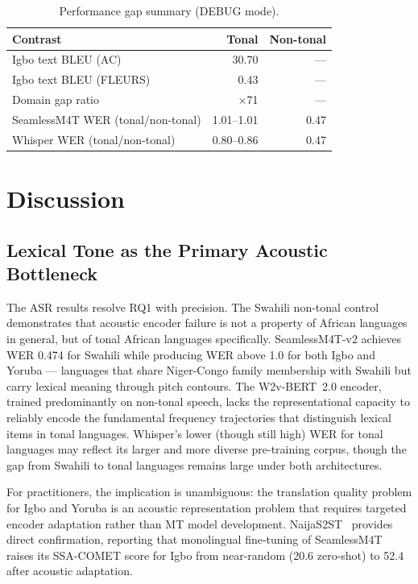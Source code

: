 \documentclass[10pt,twocolumn]{article}
\begin{document}
\begin{table}[H]
\centering
\caption{Performance gap summary (DEBUG mode).}
\label{tab:summary}
\small
\setlength{\tabcolsep}{3pt}
\begin{tabular}{p{4cm}rr}
\toprule
\textbf{Contrast} & \textbf{Tonal} & \textbf{Non-tonal} \\
\midrule
Igbo text BLEU (AC)             & 30.70 & --- \\
Igbo text BLEU (FLEURS)         & 0.43  & --- \\
Domain gap ratio                & $\times$71 & --- \\
\midrule
SeamlessM4T WER (tonal/non-tonal)  & 1.01--1.01  & 0.47 \\
Whisper WER (tonal/non-tonal)      & 0.80--0.86  & 0.47 \\
\bottomrule
\end{tabular}
\end{table}

\section{Discussion}

\subsection{Lexical Tone as the Primary Acoustic Bottleneck}

The ASR results resolve RQ1 with precision.
The Swahili non-tonal control demonstrates that acoustic encoder
failure is not a property of African languages in general, but of
tonal African languages specifically.
SeamlessM4T-v2 achieves WER 0.474 for Swahili while producing WER
above 1.0 for both Igbo and Yoruba --- languages that share
Niger-Congo family membership with Swahili but carry lexical
meaning through pitch contours.
The W2v-BERT~2.0 encoder, trained predominantly on non-tonal
speech, lacks the representational capacity to reliably encode
the fundamental frequency trajectories that distinguish lexical
items in tonal languages.
Whisper's lower (though still high) WER for tonal languages may
reflect its larger and more diverse pre-training corpus, though
the gap from Swahili to tonal languages remains large under both
architectures.

For practitioners, the implication is unambiguous: the translation
quality problem for Igbo and Yoruba is an acoustic representation
problem that requires targeted encoder adaptation rather than MT
model development.
NaijaS2ST~\cite{maltais2026naijas2st} provides direct confirmation,
reporting that monolingual fine-tuning of SeamlessM4T raises its
SSA-COMET score for Igbo from near-random (20.6 zero-shot) to 52.4
after acoustic adaptation.
\end{document}
